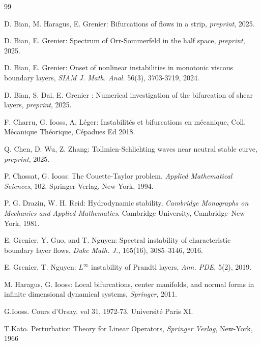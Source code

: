\documentclass[11pt]{article}
\begin{document}
\begin{thebibliography}{99}



 D. Bian, M. Haragus, E. Grenier: Bifurcations
of flows in a strip, {\it preprint}, 2025.

 D. Bian, E. Grenier: Spectrum of Orr-Sommerfeld in the half space, {\it preprint}, 2025.

 D. Bian, E. Grenier:  Onset of nonlinear instabilities in monotonic viscous boundary layers, {\it SIAM
J. Math. Anal.} 56(3), 3703-3719, 2024.

 D. Bian, S. Dai, E. Grenier : Numerical investigation of the bifurcation of shear layers, {\it preprint}, 2025.

 F. Charru, G. Iooss, A. L\'eger: Instabilités et bifurcations en mécanique, Coll. Mécanique Théorique, Cépadues Ed 2018.

Q. Chen, D. Wu, Z. Zhang: Tollmien-Schlichting waves near neutral stable curve, 
{\it preprint}, 2025.

 P. Chossat, G. Iooss: The Couette-Taylor problem.  {\it Applied Mathematical Sciences}, 102. Springer-Verlag, New York, 1994.
  
  P. G.  Drazin, W. H. Reid:  Hydrodynamic stability, {\it  Cambridge Monographs on Mechanics and Applied Mathematics}. Cambridge University, Cambridge--New York, 1981.





  E. Grenier, Y. Guo, and T. Nguyen: Spectral instability of characteristic boundary layer flows, {\it Duke Math. J., } 165(16), 3085--3146, 2016.

  E. Grenier, T. Nguyen: $L^\infty$ instability of Prandtl layers, {\it Ann. PDE}, 5(2), 2019.
 
 M. Haragus, G. Iooss: Local bifurcations, center manifolds, and normal forms in infinite dimensional dynamical systems, {\it Springer}, 2011.


 G.Iooss. Cours d'Orsay. vol 31, 1972-73. Universit\'{e} Paris XI.



 T.Kato. Perturbation Theory for Linear Operators, {\it Springer Verlag}, New-York, 1966


\end{thebibliography}
\end{document}
